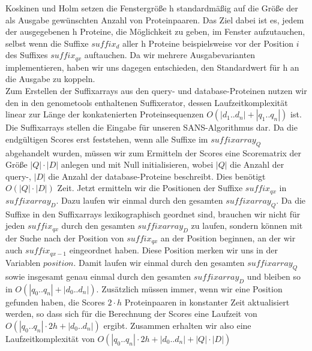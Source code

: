\documentclass{article}
\begin{document}
Koskinen und Holm setzen die Fenstergröße h standardmäßig auf die Größe der als Ausgabe gewünschten Anzahl von Proteinpaaren. Das Ziel dabei ist es, jedem der ausgegebenen h Proteine, die Möglichkeit zu geben, im Fenster aufzutauchen, selbst wenn die Suffixe $suffix_{d}$ aller h Proteine beispielsweise vor der Position $i$ des Suffixes $suffix_{qx}$ auftauchen. Da wir mehrere Ausgabevarianten implementieren, haben wir uns dagegen entschieden, den Standardwert für h an die Ausgabe zu koppeln.\\
Zum Erstellen der Suffixarrays aus den query- und database-Proteinen nutzen wir den in den genometools enthaltenen Suffixerator, dessen Laufzeitkomplexität linear zur Länge der konkatenierten Proteinsequenzen $O(|d_1..d_n|+|q_1..q_n|)$ ist. Die Suffixarrays stellen die Eingabe für unseren SANS-Algorithmus dar.
Da die endgültigen Scores erst feststehen, wenn alle Suffixe im $suffixarray_Q$ abgehandelt wurden, müssen wir zum Ermitteln der Scores eine Scorematrix der Größe $|Q|\cdot|D|$ anlegen und mit Null initialisieren, wobei $|Q|$ die Anzahl der query-, $|D|$ die Anzahl der database-Proteine beschreibt. Dies benötigt $O(|Q|\cdot|D|)$ Zeit. Jetzt ermitteln wir die Positionen der Suffixe $suffix_{qx}$ in $suffixarray_D$. Dazu laufen wir einmal durch den gesamten $suffixarray_Q$. Da die Suffixe in den Suffixarrays lexikographisch geordnet sind, brauchen wir nicht für jeden $suffix_{qx}$ durch den gesamten $suffixarray_D$ zu laufen, sondern können mit der Suche nach der Position von $suffix_{qx}$ an der Position beginnen, an der wir auch $suffix_{qx-1}$ eingeordnet haben. Diese Position merken wir uns in der Variablen $position$. Damit laufen wir einmal durch den gesamten $suffixarray_Q$ sowie insgesamt genau einmal durch den gesamten $suffixarray_D$ und bleiben so in $O(|q_0..q_n| + |d_0..d_n|)$. Zusätzlich müssen immer, wenn wir eine Position gefunden haben, die Scores $2 \cdot h$ Proteinpaaren in konstanter Zeit aktualisiert werden, so dass sich für die Berechnung der Scores eine Laufzeit von ${O(|q_0..q_n|\cdot2h + |d_0..d_n|)}$ ergibt. Zusammen erhalten wir also eine Laufzeitkomplexität von  ${O(|q_0..q_n|\cdot2h + |d_0..d_n|+|Q|\cdot|D|)}$
\end{document}
